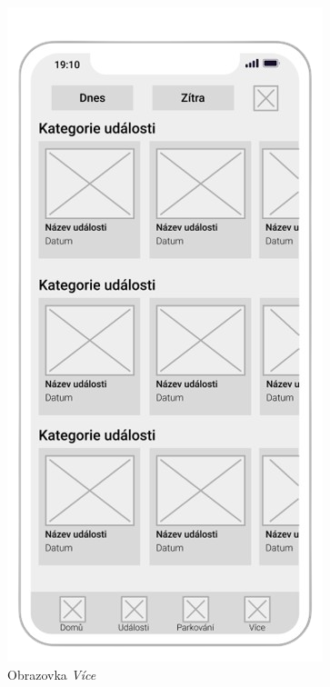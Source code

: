 \begin{minipage}[t]{0.45\textwidth}
\begin{figure}[H]
    \includegraphics[width=.7\textwidth]{events_wireframe.png}
    \caption{Obrazovka \textit{Více}}
    \label{fig:wireframe2}
  \end{figure}
\end{minipage}

